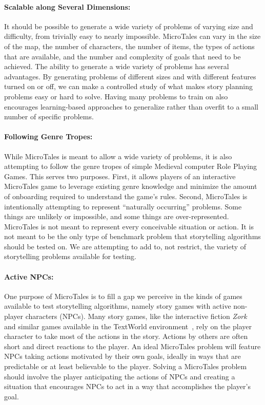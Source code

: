\documentclass{nilreport}
\begin{document}
\paragraph{Scalable along Several Dimensions:} It should be possible to generate a wide variety of problems of varying size and difficulty, from trivially easy to nearly impossible. MicroTales can vary in the size of the map, the number of characters, the number of items, the types of actions that are available, and the number and complexity of goals that need to be achieved. The ability to generate a wide variety of problems has several advantages. By generating problems of different sizes and with different features turned on or off, we can make a controlled study of what makes story planning problems easy or hard to solve. Having many problems to train on also encourages learning-based approaches to generalize rather than overfit to a small number of specific problems.

\paragraph{Following Genre Tropes:} While MicroTales is meant to allow a wide variety of problems, it is also attempting to follow the genre tropes of simple Medieval computer Role Playing Games. This serves two purposes. First, it allows players of an interactive MicroTales game to leverage existing genre knowledge and minimize the amount of onboarding required to understand the game's rules. Second, MicroTales is intentionally attempting to represent ``naturally occurring'' problems. Some things are unlikely or impossible, and some things are over-represented. MicroTales is not meant to represent every conceivable situation or action. It is not meant to be the only type of benchmark problem that storytelling algorithms should be tested on. We are attempting to add to, not restrict, the variety of storytelling problems available for testing.

\paragraph{Active NPCs:} One purpose of MicroTales is to fill a gap we perceive in the kinds of games available to test storytelling algorithms, namely story games with active non-player characters (NPCs). Many story games, like the interactive fiction {\em Zork}~\cite{anderson1980zork} and similar games available in the TextWorld environment~\cite{cote2019textworld}, rely on the player character to take most of the actions in the story. Actions by others are often short and direct reactions to the player. An ideal MicroTales problem will feature NPCs taking actions motivated by their own goals, ideally in ways that are predictable or at least believable to the player. Solving a MicroTales problem should involve the player anticipating the actions of NPCs and creating a situation that encourages NPCs to act in a way that accomplishes the player's goal.
\end{document}
